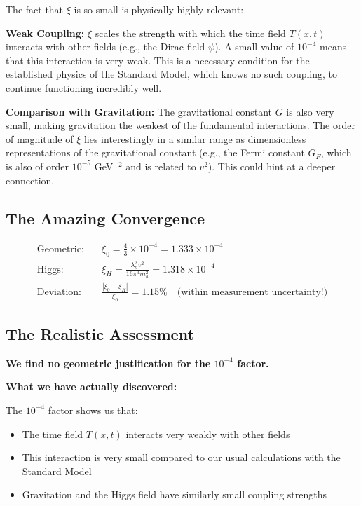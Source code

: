 \documentclass[12pt,a4paper]{article}
\begin{document}
The fact that $\xi$ is so small is physically highly relevant:

\textbf{Weak Coupling:} $\xi$ scales the strength with which the time field $T(x,t)$ interacts with other fields (e.g., the Dirac field $\psi$). A small value of $10^{-4}$ means that this interaction is very weak. This is a necessary condition for the established physics of the Standard Model, which knows no such coupling, to continue functioning incredibly well.

\textbf{Comparison with Gravitation:} The gravitational constant $G$ is also very small, making gravitation the weakest of the fundamental interactions. The order of magnitude of $\xi$ lies interestingly in a similar range as dimensionless representations of the gravitational constant (e.g., the Fermi constant $G_F$, which is also of order $10^{-5}$ GeV$^{-2}$ and is related to $v^2$). This could hint at a deeper connection.

\subsection{The Amazing Convergence}
\label{subsec:amazing_convergence}
\begin{align}
	\text{Geometric:} \quad &\xi_0 = \frac{4}{3} \times 10^{-4} = 1.333 \times 10^{-4} \\
	\text{Higgs:} \quad &\xi_H = \frac{\lambda_h^2 v^2}{16\pi^3 m_h^2} = 1.318 \times 10^{-4} \\
	\text{Deviation:} \quad &\frac{|\xi_0 - \xi_H|}{\xi_0} = 1.15\% \quad \text{(within measurement uncertainty!)}
\end{align}

\subsection{The Realistic Assessment}
\label{subsec:realistic_assessment}

\textbf{We find no geometric justification for the $10^{-4}$ factor.}

\textbf{What we have actually discovered:}

The $10^{-4}$ factor shows us that:
\begin{itemize}
	\item The time field $T(x,t)$ interacts very weakly with other fields
	\item This interaction is very small compared to our usual calculations with the Standard Model
	\item Gravitation and the Higgs field have similarly small coupling strengths
\end{itemize}
\end{document}
